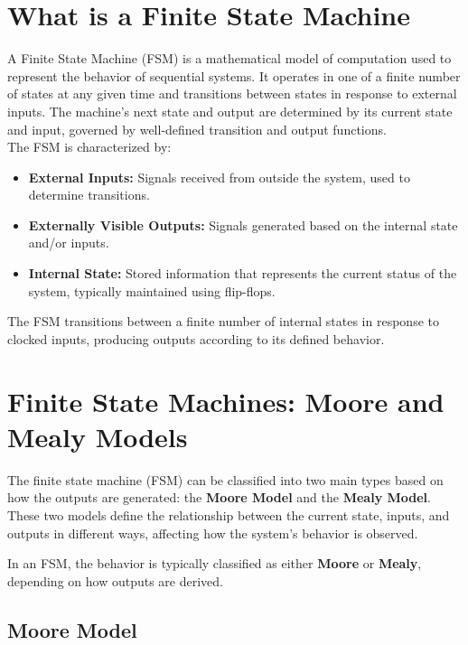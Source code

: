 \documentclass[a4paper,12pt]{article}
\begin{document}
\newpage
\tableofcontents
\newpage

\section{What is a Finite State Machine}

A Finite State Machine (FSM) is a mathematical model of computation used to represent the behavior of sequential systems. It operates in one of a finite number of states at any given time and transitions between states in response to external inputs. The machine's next state and output are determined by its current state and input, governed by well-defined transition and output functions. \\

The FSM is characterized by:

\begin{itemize}
    \item \textbf{External Inputs:} Signals received from outside the system, used to determine transitions.
    \item \textbf{Externally Visible Outputs:} Signals generated based on the internal state and/or inputs.
    \item \textbf{Internal State:} Stored information that represents the current status of the system, typically maintained using flip-flops.
\end{itemize}

The FSM transitions between a finite number of internal states in response to clocked inputs, producing outputs according to its defined behavior.

\section{Finite State Machines: Moore and Mealy Models}

The finite state machine (FSM) can be classified into two main types based on how the outputs are generated: the \textbf{Moore Model} and the \textbf{Mealy Model}. These two models define the relationship between the current state, inputs, and outputs in different ways, affecting how the system's behavior is observed.

In an FSM, the behavior is typically classified as either \textbf{Moore} or \textbf{Mealy}, depending on how outputs are derived.

\subsection{Moore Model}
\end{document}
